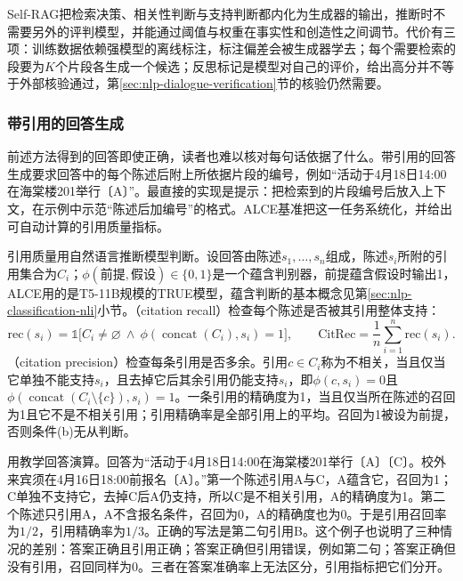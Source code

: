 Self-RAG把检索决策、相关性判断与支持判断都内化为生成器的输出，推断时不需要另外的评判模型，并能通过阈值与权重在事实性和创造性之间调节。代价有三项：训练数据依赖强模型的离线标注，标注偏差会被生成器学去；每个需要检索的段要为$K$个片段各生成一个候选；反思标记是模型对自己的评价，给出高分并不等于外部核验通过，第\ref{sec:nlp-dialogue-verification}节的核验仍然需要。

\subsubsection{带引用的回答生成}
\label{sec:nlp-dialogue-citation}

前述方法得到的回答即使正确，读者也难以核对每句话依据了什么。带引用的回答生成要求回答中的每个陈述后附上所依据片段的编号，例如“活动于4月18日14:00在海棠楼201举行〔A〕”。最直接的实现是提示：把检索到的片段编号后放入上下文，在示例中示范“陈述后加编号”的格式。ALCE基准把这一任务系统化，并给出可自动计算的引用质量指标。

引用质量用自然语言推断模型判断。设回答由陈述$s_1,\ldots,s_n$组成，陈述$s_i$所附的引用集合为$C_i$；$\phi(\text{前提},\text{假设})\in\{0,1\}$是一个蕴含判别器，前提蕴含假设时输出1，ALCE用的是T5-11B规模的TRUE模型，蕴含判断的基本概念见第\ref{sec:nlp-classification-nli}小节。（citation recall）检查每个陈述是否被其引用整体支持：
\begin{equation}
  \mathrm{rec}(s_i)=\mathbb 1\bigl[C_i\neq\varnothing\ \wedge\ \phi(\operatorname{concat}(C_i),s_i)=1\bigr],
  \qquad
  \mathrm{CitRec}=\frac1n\sum_{i=1}^{n}\mathrm{rec}(s_i).
  \label{eq:nlp-dialogue-cite-recall}
\end{equation}
（citation precision）检查每条引用是否多余。引用$c\in C_i$称为不相关，当且仅当它单独不能支持$s_i$，且去掉它后其余引用仍能支持$s_i$，即$\phi(c,s_i)=0$且$\phi(\operatorname{concat}(C_i\setminus\{c\}),s_i)=1$。一条引用的精确度为1，当且仅当所在陈述的召回为1且它不是不相关引用；引用精确率是全部引用上的平均。召回为1被设为前提，否则条件(b)无从判断。

用教学回答演算。回答为“活动于4月18日14:00在海棠楼201举行〔A〕〔C〕。校外来宾须在4月16日18:00前报名〔A〕。”第一个陈述引用A与C，A蕴含它，召回为1；C单独不支持它，去掉C后A仍支持，所以C是不相关引用，A的精确度为1。第二个陈述只引用A，A不含报名条件，召回为0，A的精确度也为0。于是引用召回率为$1/2$，引用精确率为$1/3$。正确的写法是第二句引用B。这个例子也说明了三种情况的差别：答案正确且引用正确；答案正确但引用错误，例如第二句；答案正确但没有引用，召回同样为0。三者在答案准确率上无法区分，引用指标把它们分开。

